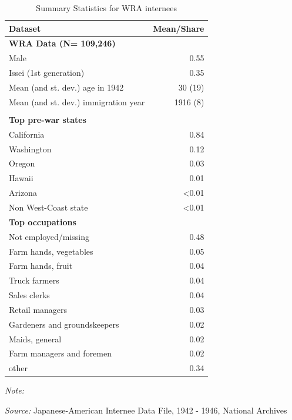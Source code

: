\documentclass[12pt]{article}
\begin{document}
\begin{table}[!h]
\centering
\caption{Summary Statistics for WRA internees}
\label{tbl:wra_demog}
\begin{tabular}{lr}
\toprule\toprule
Dataset & Mean/Share \\
\midrule
\multicolumn{2}{l}{\textbf{WRA Data (N= 109,246)}} \\
\quad Male                                    & 0.55 \\
\quad Issei (1st generation)                  & 0.35 \\
\quad Mean (and st. dev.) age in 1942         & 30 (19) \\
\quad Mean (and st. dev.) immigration year    & 1916 (8) \\
\\
\multicolumn{2}{l}{\textbf{Top pre-war states}} \\
\quad California                              & 0.84 \\
\quad Washington                              & 0.12 \\
\quad Oregon                                  & 0.03 \\
\quad Hawaii                                  & 0.01 \\
\quad Arizona                                 & <0.01 \\
\quad Non West-Coast state                    & <0.01
\\
\multicolumn{2}{l}{\textbf{Top occupations}} \\
\quad Not employed/missing                    & 0.48 \\
\quad Farm hands, vegetables                  & 0.05 \\
\quad Farm hands, fruit                       & 0.04 \\
\quad Truck farmers                           & 0.04 \\
\quad Sales clerks                            & 0.04 \\
\quad Retail managers                         & 0.03 \\
\quad Gardeners and groundskeepers            & 0.02 \\
\quad Maids, general                          & 0.02 \\
\quad Farm managers and foremen               & 0.02 \\
\quad other                                   & 0.34 \\
\bottomrule
\end{tabular}

{\footnotesize\emph{Note:}

\emph{Source:} Japanese-American Internee Data File, 1942 - 1946, National Archives
}
\end{table}
\end{document}
